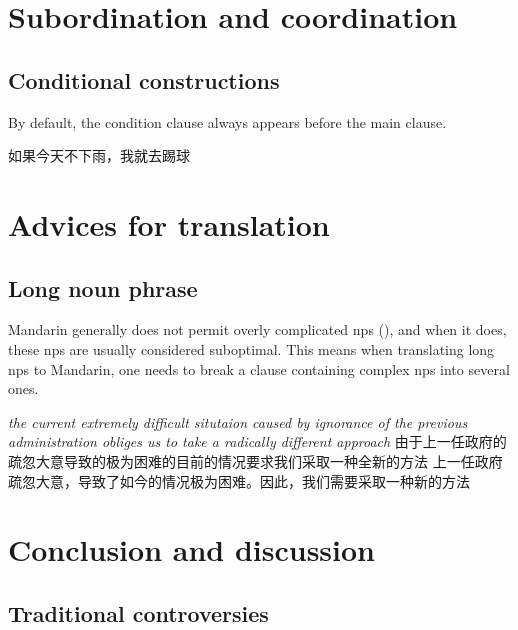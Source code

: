\documentclass[UTF8, a4paper, oneside, scheme=plain, 12pt]{ctexrep}
\newcommand{\form}[1]{\emph{#1}}
\begin{document}
\chapter{Subordination and coordination}

\section{Conditional constructions}

By default, the condition clause always appears before the main clause.

\begin{exe}
    \ex 如果今天不下雨，我就去踢球
\end{exe}

\chapter{Advices for translation}

\section{Long noun phrase}\label{sec:translation.long-noun-phrases}

Mandarin generally does not permit overly complicated \acp{np} (),
and when it does, these \acp{np} are usually considered suboptimal.
This means when translating long \acp{np} to Mandarin,
one needs to break a clause containing complex \acp{np} into several ones.

\begin{exe}
    \ex\begin{xlist}
        \ex \form{the current extremely difficult situtaion caused by ignorance of the previous administration obliges us to take a radically different approach}
        \ex 由于上一任政府的疏忽大意导致的极为困难的目前的情况要求我们采取一种全新的方法
        \ex 上一任政府疏忽大意，导致了如今的情况极为困难。因此，我们需要采取一种新的方法
    \end{xlist}
\end{exe}

\chapter{Conclusion and discussion}

\section{Traditional controversies}
\end{document}
